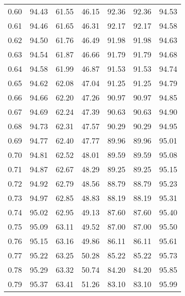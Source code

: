 \begin{tabular}{|c|c|c|c|c|c|c|}
      0.60 &     94.43 &     61.55 &      46.15 &   92.36 &      92.36 &         94.53 \\
      0.61 &     94.46 &     61.65 &      46.31 &   92.17 &      92.17 &         94.58 \\
      0.62 &     94.50 &     61.76 &      46.49 &   91.98 &      91.98 &         94.63 \\
      0.63 &     94.54 &     61.87 &      46.66 &   91.79 &      91.79 &         94.68 \\
      0.64 &     94.58 &     61.99 &      46.87 &   91.53 &      91.53 &         94.74 \\
      0.65 &     94.62 &     62.08 &      47.04 &   91.25 &      91.25 &         94.79 \\
      0.66 &     94.66 &     62.20 &      47.26 &   90.97 &      90.97 &         94.85 \\
      0.67 &     94.69 &     62.24 &      47.39 &   90.63 &      90.63 &         94.90 \\
      0.68 &     94.73 &     62.31 &      47.57 &   90.29 &      90.29 &         94.95 \\
      0.69 &     94.77 &     62.40 &      47.77 &   89.96 &      89.96 &         95.01 \\
      0.70 &     94.81 &     62.52 &      48.01 &   89.59 &      89.59 &         95.08 \\
      0.71 &     94.87 &     62.67 &      48.29 &   89.25 &      89.25 &         95.15 \\
      0.72 &     94.92 &     62.79 &      48.56 &   88.79 &      88.79 &         95.23 \\
      0.73 &     94.97 &     62.85 &      48.83 &   88.19 &      88.19 &         95.31 \\
      0.74 &     95.02 &     62.95 &      49.13 &   87.60 &      87.60 &         95.40 \\
      0.75 &     95.09 &     63.11 &      49.52 &   87.00 &      87.00 &         95.50 \\
      0.76 &     95.15 &     63.16 &      49.86 &   86.11 &      86.11 &         95.61 \\
      0.77 &     95.22 &     63.25 &      50.28 &   85.22 &      85.22 &         95.73 \\
      0.78 &     95.29 &     63.32 &      50.74 &   84.20 &      84.20 &         95.85 \\
      0.79 &     95.37 &     63.41 &      51.26 &   83.10 &      83.10 &         95.99 \\

\end{tabular}
